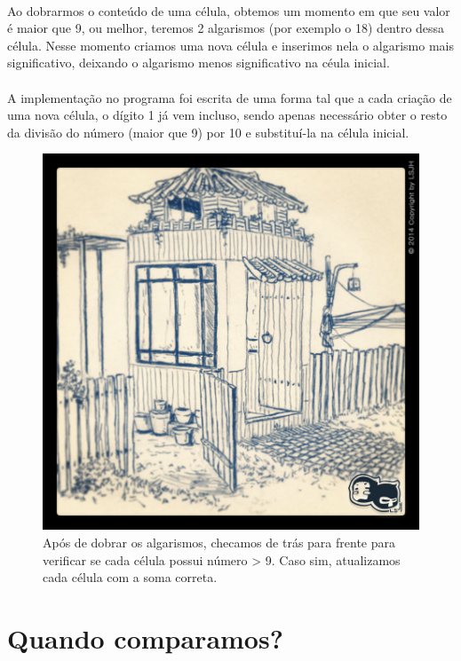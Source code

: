 \documentclass[10pt,a4paper]{article}
\begin{document}
		\paragraph*{} Ao dobrarmos o conteúdo de uma célula, obtemos um momento em que seu valor é maior que 9, ou melhor, teremos 2 algarismos (por exemplo o 18) dentro dessa célula. Nesse momento criamos uma nova célula e inserimos nela o algarismo mais significativo, deixando o algarismo menos significativo na céula inicial.
		\paragraph*{} A implementação no programa foi escrita de uma forma tal que a cada criação de uma nova célula, o dígito 1 já vem incluso, sendo apenas necessário obter o resto da divisão do número (maior que 9) por 10 e substituí-la na célula inicial.
		
		\begin{figure}[h!]
			\centering
				\includegraphics[scale=0.2]{02.jpg}
				\caption{Após de dobrar os algarismos, checamos de trás para frente para verificar se cada célula possui número > 9. Caso sim, atualizamos cada célula com a soma correta.}
		\end{figure}
		
\section{Quando comparamos?}
\end{document}
